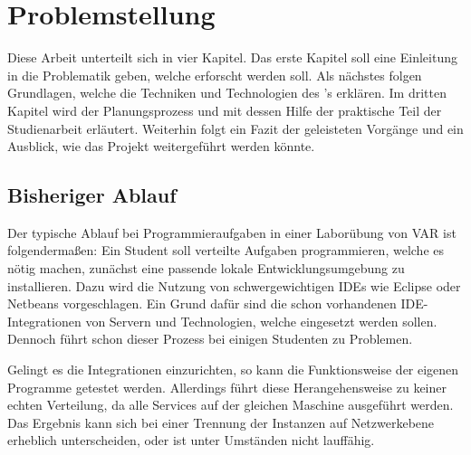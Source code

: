 \chapter{Problemstellung}
Diese Arbeit unterteilt sich in vier Kapitel.
Das erste Kapitel soll eine Einleitung in die Problematik geben, welche erforscht werden soll.
Als nächstes folgen Grundlagen, welche die Techniken und Technologien des 's erklären.
Im dritten Kapitel wird der Planungsprozess und mit dessen Hilfe der praktische Teil der Studienarbeit erläutert.
Weiterhin folgt ein Fazit der geleisteten Vorgänge und ein Ausblick, wie das Projekt weitergeführt werden könnte.

\section{Bisheriger Ablauf}
Der typische Ablauf bei Programmieraufgaben in einer Laborübung von  \ac{VAR} ist folgendermaßen:
Ein Student soll verteilte Aufgaben programmieren, welche es nötig machen, zunächst eine passende lokale Entwicklungsumgebung zu installieren.
Dazu wird die Nutzung von schwergewichtigen \acp{IDE} wie Eclipse oder Netbeans vorgeschlagen.
Ein Grund dafür sind die schon vorhandenen \ac{IDE}-Integrationen von Servern und Technologien, welche eingesetzt werden sollen.
Dennoch führt schon dieser Prozess bei einigen Studenten zu Problemen.
\par
Gelingt es die Integrationen einzurichten, so kann die Funktionsweise der eigenen Programme getestet werden.
Allerdings führt diese Herangehensweise zu keiner echten Verteilung, da alle Services auf der gleichen Maschine ausgeführt werden.
Das Ergebnis kann sich bei einer Trennung der Instanzen auf Netzwerkebene erheblich unterscheiden, oder ist unter Umständen nicht lauffähig.
